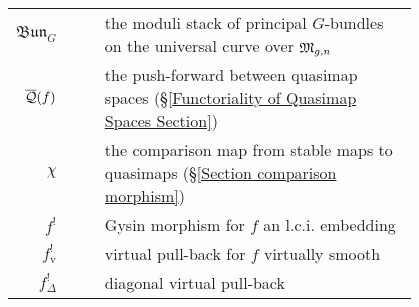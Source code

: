 \begin{longtabu}{r c | c p{0.8\linewidth}}
$\mathfrak{Bun}_{G}$ & & & the moduli stack of principal $G$-bundles on the universal curve over $\mathfrak M_{g,n}$ \\
$\overline{\mathcal{Q}}(f)$ & & & the push-forward between quasimap spaces (\S \ref{Functoriality of Quasimap Spaces Section}) \\
$\chi$ & & & the comparison map from stable maps to quasimaps (\S \ref{Section comparison morphism}) \\
$f^!$ & & & Gysin morphism for $f$ an l.c.i. embedding \\
$f^!_{\text{v}}$ & & & virtual pull-back for $f$ virtually smooth \\
$f^!_{\Delta}$ & & & diagonal virtual pull-back
\end{longtabu}